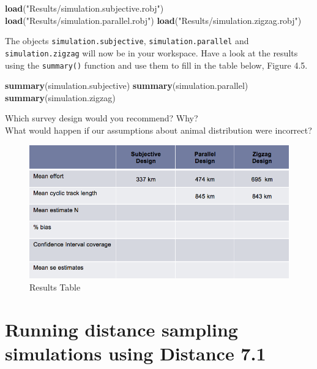 \documentclass[]{book}
\newenvironment{Shaded}{\begin{snugshade}}{\end{snugshade}}
\newcommand{\KeywordTok}[1]{\textcolor[rgb]{0.13,0.29,0.53}{\textbf{#1}}}
\newcommand{\StringTok}[1]{\textcolor[rgb]{0.31,0.60,0.02}{#1}}
\newcommand{\NormalTok}[1]{#1}
\theoremstyle{definition}
\theoremstyle{definition}
\theoremstyle{remark}
\begin{document}
\begin{Shaded}
\begin{Highlighting}[]
\KeywordTok{load}\NormalTok{(}\StringTok{"Results/simulation.subjective.robj"}\NormalTok{)}
\KeywordTok{load}\NormalTok{(}\StringTok{"Results/simulation.parallel.robj"}\NormalTok{)}
\KeywordTok{load}\NormalTok{(}\StringTok{"Results/simulation.zigzag.robj"}\NormalTok{)}
\end{Highlighting}
\end{Shaded}

The objects \texttt{simulation.subjective}, \texttt{simulation.parallel}
and \texttt{simulation.zigzag} will now be in your workspace. Have a
look at the results using the \texttt{summary()} function and use them
to fill in the table below, Figure 4.5.

\begin{Shaded}
\begin{Highlighting}[]
\KeywordTok{summary}\NormalTok{(simulation.subjective)}
\KeywordTok{summary}\NormalTok{(simulation.parallel)}
\KeywordTok{summary}\NormalTok{(simulation.zigzag)}
\end{Highlighting}
\end{Shaded}

Which survey design would you recommend? Why?\\
What would happen if our assumptions about animal distribution were
incorrect?

\begin{figure}
\centering
\includegraphics{images/results.png}
\caption{Results Table}
\end{figure}

\section{Running distance sampling simulations using Distance
7.1}\label{running-distance-sampling-simulations-using-distance-7.1}
\end{document}
